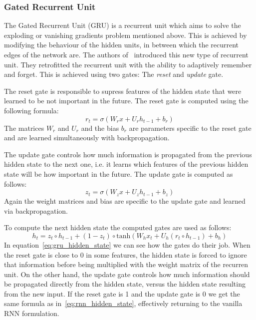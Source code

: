\subsubsection{Gated Recurrent Unit}
The Gated Recurrent Unit (GRU) is a recurrent unit which aims to solve the exploding or vanishing gradients problem mentioned above.
This is achieved by modifying the behaviour of the hidden units, in between which the recurrent edges of the network are.
The authors of~\cite{gru} introduced this new type of recurrent unit.
They retrofitted the recurrent unit with the ability to adaptively remember and forget.
This is achieved using two gates: The \emph{reset} and \emph{update} gate.
\par
The reset gate is responsible to supress features of the hidden state that were learned to be not important in the future.
The reset gate is computed using the following formula:
\begin{equation}\label{eq:gru_reset_gate}
    r_t = \sigma( W_rx + U_rh_{t-1} + b_r)
\end{equation}
The matrices $W_r$ and $U_r$ and the bias $b_r$ are parameters specific to the reset gate and are learned simultaneously with backpropagation.
\par
The update gate controls how much information is propagated from the previous hidden state to the next one, i.e. it learns which features of the previous hidden state will be how important in the future.
The update gate is computed as follows:
\begin{equation}\label{eq:gru_update_gate}
    z_t = \sigma( W_zx + U_zh_{t-1} + b_z)
\end{equation}
Again the weight matrices and bias are specific to the update gate and learned via backpropagation.
\par
To compute the next hidden state the computed gates are used as follows:
\begin{equation}\label{eq:gru_hidden_state}
    h_t = z_t \circ h_{t-1} + (1 - z_t) \circ \text{tanh}(W_hx_t + U_h(r_t \circ h_{t-1}) + b_h)
\end{equation}
In equation~\ref{eq:gru_hidden_state} we can see how the gates do their job.
When the reset gate is close to 0 in some features, the hidden state is forced to ignore that information before being multiplied with the weight matrix of the recurren unit.
On the other hand, the update gate controls how much information should be propagated directly from the hidden state, versus the hidden state resulting from the new input.
If the reset gate is 1 and the update gate is 0 we get the same formula as in~\ref{eq:rnn_hidden_state}, effectively returning to the vanilla RNN formulation.
